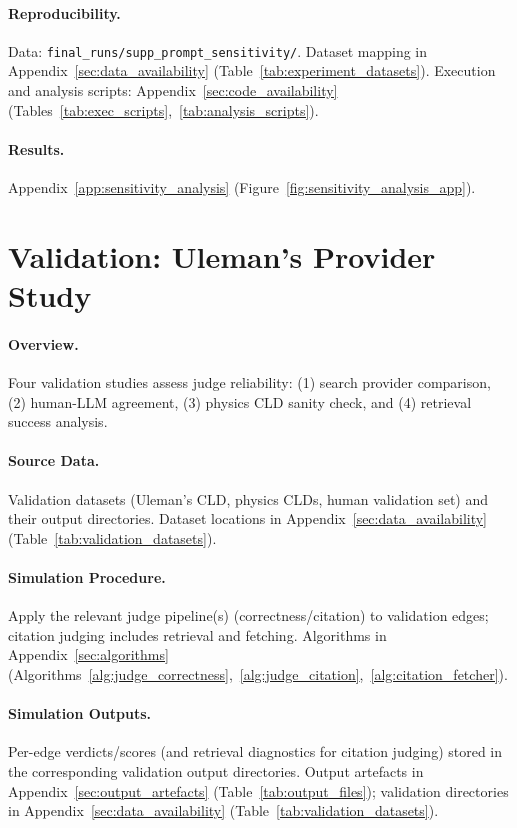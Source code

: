 \paragraph{Reproducibility.}
Data: \texttt{final\_runs/supp\_prompt\_sensitivity/}. Dataset mapping in Appendix~\ref{sec:data_availability} (Table~\ref{tab:experiment_datasets}). Execution and analysis scripts: Appendix~\ref{sec:code_availability} (Tables~\ref{tab:exec_scripts},~\ref{tab:analysis_scripts}).

\paragraph{Results.}
Appendix~\ref{app:sensitivity_analysis} (Figure~\ref{fig:sensitivity_analysis_app}).

\section{Validation: Uleman's Provider Study}
\label{sec:rq1a_validation_studies}

\paragraph{Overview.}
Four validation studies assess judge reliability: (1) search provider comparison, (2) human-LLM agreement, (3) physics CLD sanity check, and (4) retrieval success analysis.

\paragraph{Source Data.}
Validation datasets (Uleman's CLD, physics CLDs, human validation set) and their output directories.
Dataset locations in Appendix~\ref{sec:data_availability} (Table~\ref{tab:validation_datasets}).

\paragraph{Simulation Procedure.}
Apply the relevant judge pipeline(s) (correctness/citation) to validation edges; citation judging includes retrieval and fetching.
Algorithms in Appendix~\ref{sec:algorithms} (Algorithms~\ref{alg:judge_correctness},~\ref{alg:judge_citation},~\ref{alg:citation_fetcher}).

\paragraph{Simulation Outputs.}
Per-edge verdicts/scores (and retrieval diagnostics for citation judging) stored in the corresponding validation output directories.
Output artefacts in Appendix~\ref{sec:output_artefacts} (Table~\ref{tab:output_files}); validation directories in Appendix~\ref{sec:data_availability} (Table~\ref{tab:validation_datasets}).

